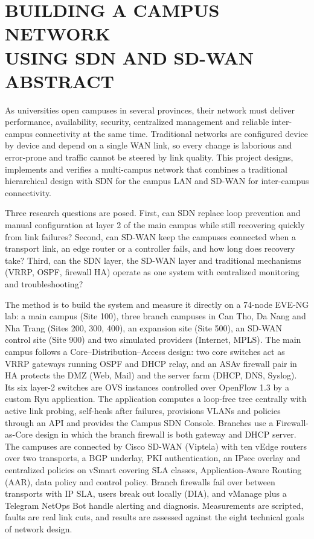 \section*{BUILDING A CAMPUS NETWORK\\USING SDN AND SD-WAN\\ABSTRACT}

As universities open campuses in several provinces, their network must deliver performance, availability, security, centralized management and reliable inter-campus connectivity at the same time. Traditional networks are configured device by device and depend on a single WAN link, so every change is laborious and error-prone and traffic cannot be steered by link quality. This project designs, implements and verifies a multi-campus network that combines a traditional hierarchical design with SDN for the campus LAN and SD-WAN for inter-campus connectivity.

Three research questions are posed. First, can SDN replace loop prevention and manual configuration at layer 2 of the main campus while still recovering quickly from link failures? Second, can SD-WAN keep the campuses connected when a transport link, an edge router or a controller fails, and how long does recovery take? Third, can the SDN layer, the SD-WAN layer and traditional mechanisms (VRRP, OSPF, firewall HA) operate as one system with centralized monitoring and troubleshooting?

The method is to build the system and measure it directly on a 74-node EVE-NG lab: a main campus (Site 100), three branch campuses in Can Tho, Da Nang and Nha Trang (Sites 200, 300, 400), an expansion site (Site 500), an SD-WAN control site (Site 900) and two simulated providers (Internet, MPLS). The main campus follows a Core--Distribution--Access design: two core switches act as VRRP gateways running OSPF and DHCP relay, and an ASAv firewall pair in HA protects the DMZ (Web, Mail) and the server farm (DHCP, DNS, Syslog). Its six layer-2 switches are OVS instances controlled over OpenFlow 1.3 by a custom Ryu application. The application computes a loop-free tree centrally with active link probing, self-heals after failures, provisions VLANs and policies through an API and provides the Campus SDN Console. Branches use a Firewall-as-Core design in which the branch firewall is both gateway and DHCP server. The campuses are connected by Cisco SD-WAN (Viptela) with ten vEdge routers over two transports, a BGP underlay, PKI authentication, an IPsec overlay and centralized policies on vSmart covering SLA classes, Application-Aware Routing (AAR), data policy and control policy. Branch firewalls fail over between transports with IP SLA, users break out locally (DIA), and vManage plus a Telegram NetOps Bot handle alerting and diagnosis. Measurements are scripted, faults are real link cuts, and results are assessed against the eight technical goals of network design.

